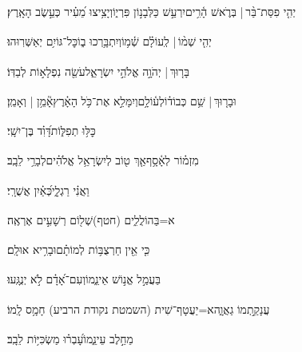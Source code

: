 \documentclass[12pt]{article}
\newcommand{\loc}[1]{\textsuperscript{\locf{#1}}}
\begin{document}
{\loc{ טז}~}‏יְהִ֤י פִסַּת־בַּ֨ר |  {\hfill}בְּרֹ֢אשׁ הָ֫רִ֥ים\newline\hspace*{.5em}יִרְעַ֣שׁ כַּלְּבָנ֣וֹן פִּרְי֑וֹ{\hfill}וְיָצִ֥יצוּ מֵ֝עִ֗יר כְּעֵ֣שֶׂב הָאָֽרֶץ׃\par

{\loc{ יז}~}‏יְהִ֤י שְׁמ֨וֹ |  לְֽעוֹלָ֗ם{\hfill}  שְׁ֫מ֥וֹ\newline\hspace*{.5em}וְיִתְבָּ֥רְכוּ ב֑וֹ{\hfill}כׇּל־גּוֹיִ֥ם יְאַשְּׁרֽוּהוּ׃\par

{\loc{ יח}~}‏בָּר֤וּךְ |  יְהֹוָ֣ה  אֱלֹהֵ֣י יִשְׂרָאֵ֑ל{\hfill}עֹשֵׂ֖ה נִפְלָא֣וֹת לְבַדּֽוֹ׃\par

{\loc{ יט}~}‏וּבָר֤וּךְ |  שֵׁ֥ם כְּבוֹד֗וֹ{\hfill}לְע֫וֹלָ֥ם\newline\hspace*{.5em}וְיִמָּלֵ֣א  אֶת־כֹּ֥ל הָאָ֗רֶץ{\hfill}אָ֘מֵ֥ן | וְאָמֵֽן׃\par

{\loc{ כ}~}‏כׇּלּ֥וּ תְפִלּ֑וֹת{\hfill}דָּ֝וִ֗ד בֶּן־יִשָֽׁי׃\par\pend
\ledpb
\pstart[\subsection*{\textcolor{red}{פרק עג}}]\label{פרק עג}
{\loc{ א}~}‏מִזְמ֗וֹר לְאָ֫סָ֥ף\newline\hspace*{.5em}אַ֤ךְ ט֖וֹב לְיִשְׂרָאֵ֥ל אֱלֹהִ֗ים{\hfill}לְבָרֵ֥י לֵבָֽב׃\par

{\loc{ ב}~}‏וַאֲנִ֗י   רַגְלָ֑י{\hfill}כְּ֝אַ֗יִן  אֲשֻׁרָֽי׃\par

{\loc{ ג}~}‏ א=בַּהוֹלֲלִ֑ים (חטף){\hfill}שְׁל֖וֹם רְשָׁעִ֣ים אֶרְאֶֽה׃\par

{\loc{ ד}~}‏כִּ֤י אֵ֖ין חַרְצֻבּ֥וֹת לְמוֹתָ֗ם{\hfill}וּבָרִ֥יא אוּלָֽם׃\par

{\loc{ ה}~}‏בַּעֲמַ֣ל אֱנ֣וֹשׁ אֵינֵ֑מוֹ{\hfill}וְעִם־אָ֝דָ֗ם לֹ֣א יְנֻגָּֽעוּ׃\par

{\loc{ ו}~}‏ עֲנָקַ֣תְמוֹ גַאֲוָ֑ה{\hfill}א=יַעֲטָף־שִׁית (השמטת נקודת הרביע) חָמָ֥ס לָֽמוֹ׃\par

{\loc{ ז}~}‏ מֵחֵ֣לֶב עֵינֵ֑מוֹ{\hfill}עָ֝בְר֗וּ מַשְׂכִּיּ֥וֹת לֵבָֽב׃\par
\end{document}
